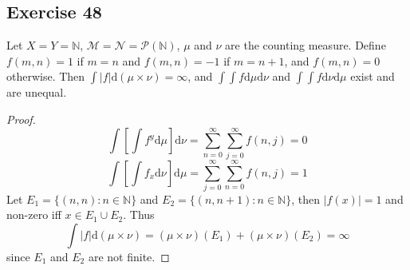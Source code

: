 \subsection*{Exercise 48}
Let $X=Y=\mathbb{N}$, $\mathcal{M}=\mathcal{N}=\mathcal{P}(\mathbb{N})$, $\mu$ and $\nu$ are the counting measure. Define $f(m,n)=1$ if $m=n$ and $f(m,n)=-1$ if $m=n+1$, and $f(m,n)=0$ otherwise. Then $\int|f|\mathrm{d}(\mu\times\nu)=\infty$, and $\int\int f\mathrm{d}\mu\mathrm{d}\nu$ and $\int\int f\mathrm{d}\nu\mathrm{d}\mu$ exist and are unequal.
\begin{proof}
    $$
    \int\left[\int f^y\mathrm{d}\mu\right]\mathrm{d}\nu=\sum^{\infty}_{n=0}\sum^{\infty}_{j=0}f(n,j)=0
    $$
    $$
    \int\left[\int f_x\mathrm{d}\nu\right]\mathrm{d}\mu=\sum^{\infty}_{j=0}\sum^{\infty}_{n=0}f(n,j)=1
    $$
    Let $E_1=\{(n,n):n\in\mathbb{N}\}$ and $E_2=\{(n,n+1):n\in\mathbb{N}\}$, then $|f(x)|=1$ and non-zero iff $x\in E_1\cup E_2$. Thus
    $$
    \int |f|\mathrm{d}(\mu\times\nu)=(\mu\times\nu)(E_1)+(\mu\times\nu)(E_2)=\infty
    $$
    since $E_1$ and $E_2$ are not finite.
\end{proof}
